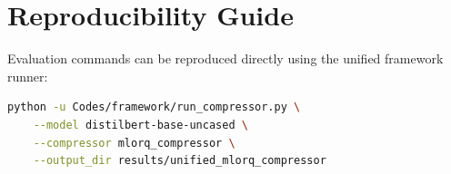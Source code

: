 \section{Reproducibility Guide}
Evaluation commands can be reproduced directly using the unified framework runner:
\begin{lstlisting}[language=bash]
python -u Codes/framework/run_compressor.py \
    --model distilbert-base-uncased \
    --compressor mlorq_compressor \
    --output_dir results/unified_mlorq_compressor
\end{lstlisting}
